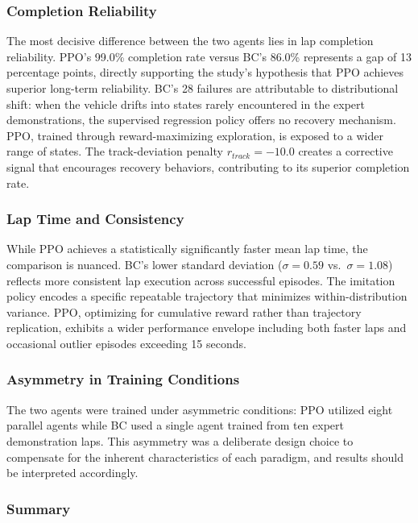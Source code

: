 \documentclass[conference]{IEEEtran}
\begin{document}
\subsubsection{Completion Reliability}

The most decisive difference between the two agents lies in lap completion reliability. PPO's 99.0\% completion rate versus BC's 86.0\% represents a gap of 13 percentage points, directly supporting the study's hypothesis that PPO achieves superior long-term reliability. BC's 28 failures are attributable to distributional shift: when the vehicle drifts into states rarely encountered in the expert demonstrations, the supervised regression policy offers no recovery mechanism. PPO, trained through reward-maximizing exploration, is exposed to a wider range of states. The track-deviation penalty $r_{track} = -10.0$ creates a corrective signal that encourages recovery behaviors, contributing to its superior completion rate.

\subsubsection{Lap Time and Consistency}

While PPO achieves a statistically significantly faster mean lap time, the comparison is nuanced. BC's lower standard deviation ($\sigma = 0.59$ vs.\ $\sigma = 1.08$) reflects more consistent lap execution across successful episodes. The imitation policy encodes a specific repeatable trajectory that minimizes within-distribution variance. PPO, optimizing for cumulative reward rather than trajectory replication, exhibits a wider performance envelope including both faster laps and occasional outlier episodes exceeding 15 seconds.

\subsubsection{Asymmetry in Training Conditions}

The two agents were trained under asymmetric conditions: PPO utilized eight parallel agents while BC used a single agent trained from ten expert demonstration laps. This asymmetry was a deliberate design choice to compensate for the inherent characteristics of each paradigm, and results should be interpreted accordingly.

\subsubsection{Summary}
\end{document}

